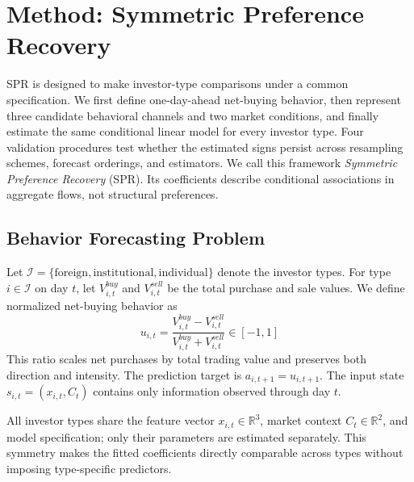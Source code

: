 
\section{Method: Symmetric Preference Recovery}
\label{sec:method}

SPR is designed to make investor-type comparisons under a common specification. We first
define one-day-ahead net-buying behavior, then represent three candidate behavioral
channels and two market conditions, and finally estimate the same conditional linear model
for every investor type. Four validation procedures test whether the estimated signs persist
across resampling schemes, forecast orderings, and estimators. We call this framework
\emph{Symmetric Preference Recovery} (SPR). Its coefficients describe conditional
associations in aggregate flows, not structural preferences.

\subsection{Behavior Forecasting Problem}
\label{sec:setup}

Let $\mathcal I=\{\mathrm{foreign},\mathrm{institutional},\mathrm{individual}\}$ denote
the investor types. For type $i\in\mathcal I$ on day $t$, let
$V^{buy}_{i,t}$ and $V^{sell}_{i,t}$ be the total purchase and sale values. We define
normalized net-buying behavior as
\begin{equation}
u_{i,t}=\frac{V^{buy}_{i,t}-V^{sell}_{i,t}}{V^{buy}_{i,t}+V^{sell}_{i,t}}\in[-1,1]
\label{eq:action}
\end{equation}
This ratio scales net purchases by total trading value and preserves both direction and
intensity. The prediction target is $a_{i,t+1}=u_{i,t+1}$. The input state
$s_{i,t}=(x_{i,t},C_t)$ contains only information observed through day $t$.

All investor types share the feature vector $x_{i,t}\in\mathbb R^3$, market context
$C_t\in\mathbb R^2$, and model specification; only their parameters are estimated
separately. This symmetry makes the fitted coefficients directly comparable across types
without imposing type-specific predictors.

